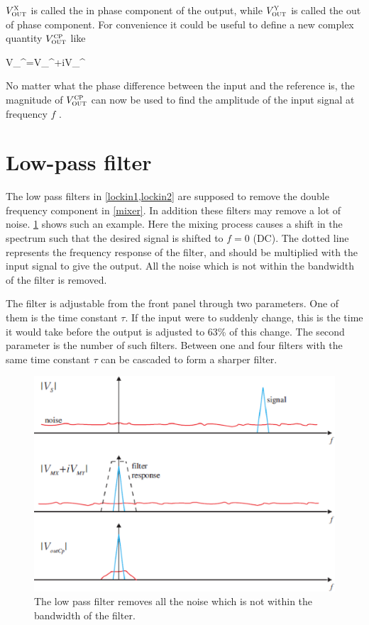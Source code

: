 $V_{\mbox{\footnotesize{\scshape{out}}}}^{\mbox{\footnotesize{\scshape{x}}}}$ is called the in phase component of the output, while $V_{\mbox{\footnotesize{\scshape{out}}}}^{\mbox{\footnotesize{\scshape{y}}}}$ is called the out of phase component. For convenience it could be useful to define a new complex quantity $V_{\mbox{\footnotesize{\scshape{out}}}}^{\mbox{\footnotesize{\scshape{cp}}}}$ like

\mate
V_{}^{}=V_{}^{}+iV_{}^{}
\atem

No matter what the phase difference between the input and the reference is, the magnitude of $V_{\mbox{\footnotesize{\scshape{out}}}}^{\mbox{\footnotesize{\scshape{cp}}}}$ can now be used to find the amplitude of the input signal at frequency $f$ .

	\section{Low-pass filter}

The low pass filters in \cref{lockin1,lockin2} are supposed to remove the double frequency component in \cref{mixer}. In addition these filters may remove a lot of noise. \cref{lockin3} shows such an example. Here the mixing process causes a shift in the spectrum such that the desired signal is shifted to $f=0$ (DC). The dotted line represents the frequency response of the filter, and should be multiplied with the input signal to give the output. All the noise which is not within the bandwidth of the filter is removed.

The filter is adjustable from the front panel through two parameters. One of them is the time constant $\tau$. If the input were to suddenly change, this is the time it would take before the output is adjusted to 63\% of this change. The second parameter is the number of such filters. Between one and four filters with the same time constant $\tau$ can be cascaded to form a sharper filter.

\begin{figure}[!hbt]\centering
\includegraphics[width=\linewidth, draft=\foto]{eps/lockin3.eps}
\caption{The low pass filter removes all the noise which is not within the bandwidth of the filter.}
\label{lockin3}
\end{figure}
